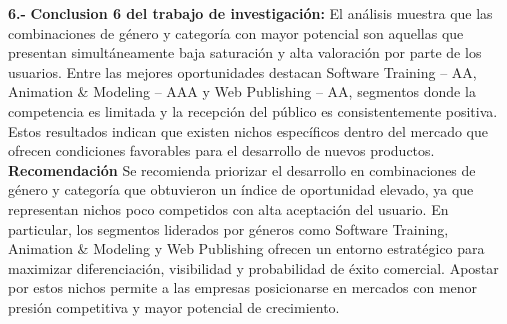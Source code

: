 \documentclass[oneside,11pt]{Latex/Classes/PhDthesisPSnPDF}
\begin{document}
\textbf{6.-} \textbf{Conclusion 6 del trabajo de investigación:} El
análisis muestra que las combinaciones de género y categoría con mayor
potencial son aquellas que presentan simultáneamente baja saturación y
alta valoración por parte de los usuarios. Entre las mejores
oportunidades destacan Software Training -- AA, Animation \& Modeling --
AAA y Web Publishing -- AA, segmentos donde la competencia es limitada y
la recepción del público es consistentemente positiva. Estos resultados
indican que existen nichos específicos dentro del mercado que ofrecen
condiciones favorables para el desarrollo de nuevos productos.\\

\textbf{Recomendación} Se recomienda priorizar el desarrollo en
combinaciones de género y categoría que obtuvieron un índice de
oportunidad elevado, ya que representan nichos poco competidos con alta
aceptación del usuario. En particular, los segmentos liderados por
géneros como Software Training, Animation \& Modeling y Web Publishing
ofrecen un entorno estratégico para maximizar diferenciación,
visibilidad y probabilidad de éxito comercial. Apostar por estos nichos
permite a las empresas posicionarse en mercados con menor presión
competitiva y mayor potencial de crecimiento.

\appendix
\renewcommand{\thechapter}{\Alph{chapter}}

\renewcommand{\bibname}{Lista de Referencias}
 
 

\end{document}
